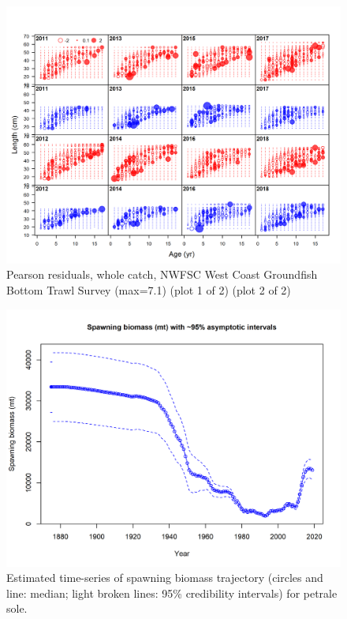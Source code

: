 \documentclass[12pt,]{article}
\begin{document}
\begin{figure}
\centering
\includegraphics{r4ss/plots_mod1/comp_condAALfit_residsflt7mkt0_page2.png}
\caption{Pearson residuals, whole catch, NWFSC West Coast Groundfish
Bottom Trawl Survey (max=7.1) (plot 1 of 2) (plot 2 of 2)
\label{fig:nwfsc_combo_pearson_2}}
\end{figure}

\begin{figure}
\centering
\includegraphics{r4ss/plots_mod1/ts7_Spawning_biomass_(mt)_with_95_asymptotic_intervals_intervals}
\caption{Estimated time-series of spawning biomass trajectory (circles
and line: median; light broken lines: 95\% credibility intervals) for
petrale sole. \label{fig:ssb}}
\end{figure}
\end{document}
